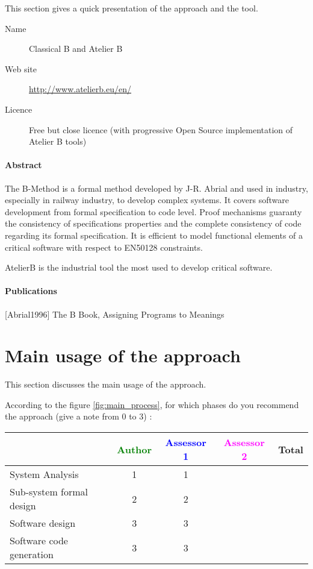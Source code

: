 This section gives a quick presentation of the approach and the tool.

\begin{description}
\item[Name] Classical B and Atelier B
\item[Web site] \url{http://www.atelierb.eu/en/}
\item[Licence] Free but close licence (with progressive Open Source implementation of Atelier B tools)
\end{description}

\paragraph{Abstract} 

The B-Method is a formal method developed by J-R. Abrial and used in industry, especially in railway industry, to develop complex systems. It covers software development from formal specification to code level. Proof mechanisms guaranty the consistency of specifications properties and the complete consistency of code regarding its formal specification. It is efficient to model  functional  elements of a critical software with respect to  EN50128 constraints.

AtelierB is the industrial  tool the most used to develop critical software.

\paragraph{Publications} 
[Abrial1996] The B Book, Assigning Programs to Meanings


\section{Main usage of the approach}
\label{main_usage}
This section discusses the main usage of the approach.

According to the figure \ref{fig:main_process}, for which phases do you recommend the approach (give a note from 0 to  3) :

\begin{tabular}{|l | c | c | c | c|}
\hline
& \textcolor{green}{Author} & \textcolor{blue}{Assessor 1} & \textcolor{magenta}{Assessor 2} & Total \\
\hline 
System Analysis & 1 & 1 & &  \\
\hline
Sub-system formal design & 2 & 2 & & \\
\hline
Software design & 3 & 3 & & \\
\hline
Software code generation & 3 & 3 & & \\
\hline
\end{tabular}

